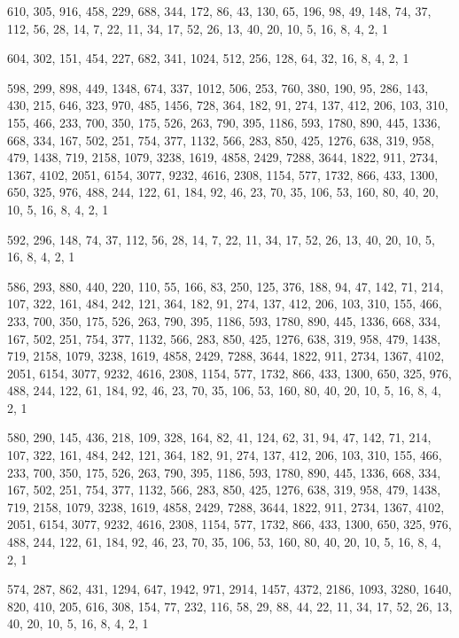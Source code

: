 \documentclass[12pt]{article}
\begin{document}
610, 305, 916, 458, 229, 688, 344, 172, 86, 43, 130, 65, 196, 98, 49, 148, 74, 37, 112, 56, 28, 14, 7, 22, 11, 34, 17, 52, 26, 13, 40, 20, 10, 5, 16, 8, 4, 2, 1

604, 302, 151, 454, 227, 682, 341, 1024, 512, 256, 128, 64, 32, 16, 8, 4, 2, 1

598, 299, 898, 449, 1348, 674, 337, 1012, 506, 253, 760, 380, 190, 95, 286, 143, 430, 215, 646, 323, 970, 485, 1456, 728, 364, 182, 91, 274, 137, 412, 206, 103, 310, 155, 466, 233, 700, 350, 175, 526, 263, 790, 395, 1186, 593, 1780, 890, 445, 1336, 668, 334, 167, 502, 251, 754, 377, 1132, 566, 283, 850, 425, 1276, 638, 319, 958, 479, 1438, 719, 2158, 1079, 3238, 1619, 4858, 2429, 7288, 3644, 1822, 911, 2734, 1367, 4102, 2051, 6154, 3077, 9232, 4616, 2308, 1154, 577, 1732, 866, 433, 1300, 650, 325, 976, 488, 244, 122, 61, 184, 92, 46, 23, 70, 35, 106, 53, 160, 80, 40, 20, 10, 5, 16, 8, 4, 2, 1

592, 296, 148, 74, 37, 112, 56, 28, 14, 7, 22, 11, 34, 17, 52, 26, 13, 40, 20, 10, 5, 16, 8, 4, 2, 1

586, 293, 880, 440, 220, 110, 55, 166, 83, 250, 125, 376, 188, 94, 47, 142, 71, 214, 107, 322, 161, 484, 242, 121, 364, 182, 91, 274, 137, 412, 206, 103, 310, 155, 466, 233, 700, 350, 175, 526, 263, 790, 395, 1186, 593, 1780, 890, 445, 1336, 668, 334, 167, 502, 251, 754, 377, 1132, 566, 283, 850, 425, 1276, 638, 319, 958, 479, 1438, 719, 2158, 1079, 3238, 1619, 4858, 2429, 7288, 3644, 1822, 911, 2734, 1367, 4102, 2051, 6154, 3077, 9232, 4616, 2308, 1154, 577, 1732, 866, 433, 1300, 650, 325, 976, 488, 244, 122, 61, 184, 92, 46, 23, 70, 35, 106, 53, 160, 80, 40, 20, 10, 5, 16, 8, 4, 2, 1

580, 290, 145, 436, 218, 109, 328, 164, 82, 41, 124, 62, 31, 94, 47, 142, 71, 214, 107, 322, 161, 484, 242, 121, 364, 182, 91, 274, 137, 412, 206, 103, 310, 155, 466, 233, 700, 350, 175, 526, 263, 790, 395, 1186, 593, 1780, 890, 445, 1336, 668, 334, 167, 502, 251, 754, 377, 1132, 566, 283, 850, 425, 1276, 638, 319, 958, 479, 1438, 719, 2158, 1079, 3238, 1619, 4858, 2429, 7288, 3644, 1822, 911, 2734, 1367, 4102, 2051, 6154, 3077, 9232, 4616, 2308, 1154, 577, 1732, 866, 433, 1300, 650, 325, 976, 488, 244, 122, 61, 184, 92, 46, 23, 70, 35, 106, 53, 160, 80, 40, 20, 10, 5, 16, 8, 4, 2, 1

574, 287, 862, 431, 1294, 647, 1942, 971, 2914, 1457, 4372, 2186, 1093, 3280, 1640, 820, 410, 205, 616, 308, 154, 77, 232, 116, 58, 29, 88, 44, 22, 11, 34, 17, 52, 26, 13, 40, 20, 10, 5, 16, 8, 4, 2, 1
\end{document}
